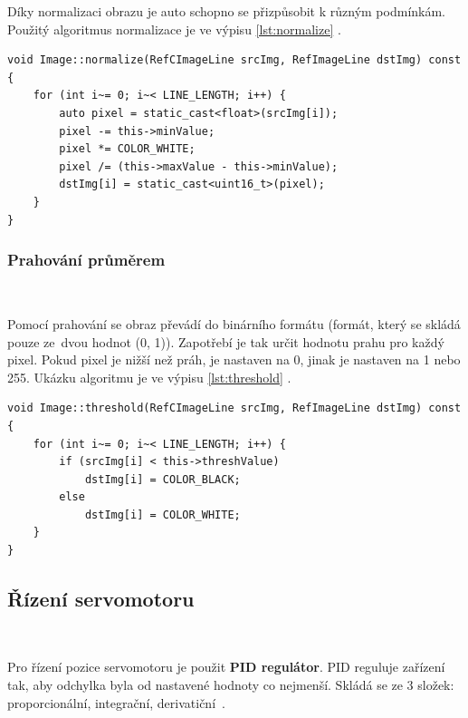 Díky normalizaci obrazu je auto schopno se přizpůsobit k různým  podmínkám. Použitý
algoritmus normalizace je ve výpisu \ref{lst:normalize} \cite{robot}.
\begin{lstlisting}[caption = Normalizace obrazu, label = lst:normalize]
void Image::normalize(RefCImageLine srcImg, RefImageLine dstImg) const {
    for (int i~= 0; i~< LINE_LENGTH; i++) {
        auto pixel = static_cast<float>(srcImg[i]);
        pixel -= this->minValue;
        pixel *= COLOR_WHITE;
        pixel /= (this->maxValue - this->minValue);
        dstImg[i] = static_cast<uint16_t>(pixel);
    }
}
\end{lstlisting}

\subsubsection*{Prahování průměrem}\

Pomocí prahování se obraz převádí do binárního formátu (formát, který se skládá
pouze ze~dvou hodnot (0, 1)). Zapotřebí je tak určit hodnotu prahu pro každý pixel.
Pokud pixel je nižší než práh, je nastaven na 0, jinak je nastaven na 1 nebo 255.
Ukázku algoritmu je ve výpisu \ref{lst:threshold} \cite{robot}.
\begin{lstlisting}[caption = Prahování průměrem, label = lst:threshold]
void Image::threshold(RefCImageLine srcImg, RefImageLine dstImg) const {
    for (int i~= 0; i~< LINE_LENGTH; i++) {
        if (srcImg[i] < this->threshValue)
            dstImg[i] = COLOR_BLACK;
        else
            dstImg[i] = COLOR_WHITE;
    }
}
\end{lstlisting}

\subsection{Řízení servomotoru}\
\label{sec:servocontrol}

Pro řízení pozice servomotoru je použit \textbf{PID regulátor}. PID reguluje
zařízení tak, aby odchylka byla od nastavené hodnoty co nejmenší. Skládá se ze 3
složek: proporcionální, integrační, derivatiční~\cite{PID}.

